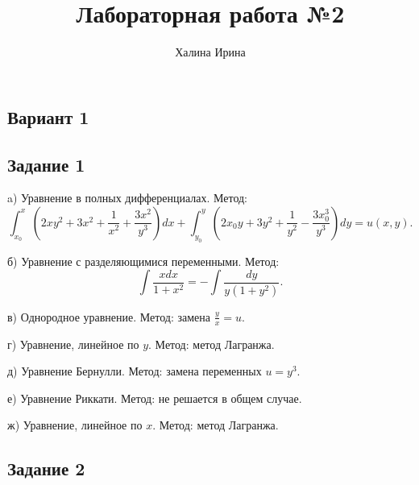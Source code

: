 \documentclass[11pt, a4paper]{article}
\title{Лабораторная работа №2}
\author{Халина Ирина}
\begin{document}
	\par\maketitle
	
	\begin{center}
	\subsection*{Вариант 1}
	\end{center}
	
	\subsection*{Задание 1}
	
	\par
	a) Уравнение в полных дифференциалах. Метод:
	\begin{equation*}
		\int_{x_0}^{x}\left(2xy^2+3x^2+\frac{1}{x^2}+\frac{3x^2}{y^3}\right)dx+\int_{y_0}^{y}\left(2x_0y+3y^2+\frac{1}{y^2}-\frac{3x_0^3}{y^3}\right)dy=u(x,y).
	\end{equation*}
	
	\noindent
	б) Уравнение с разделяющимися переменными. Метод:
	\begin{equation*}
		\int \frac{xdx}{1+x^2}=-\int \frac{dy}{y(1+y^2)}.
	\end{equation*}
	
	\noindent
	в) Однородное уравнение. Метод: замена $\frac{y}{x}=u$.
	
	\noindent
	г) Уравнение, линейное по $y$. Метод: метод Лагранжа.
	
	\noindent
	д) Уравнение Бернулли. Метод: замена переменных $u=y^3$.
	
	\noindent
	е) Уравнение Риккати. Метод: не решается в общем случае.
	
	\noindent
	ж) Уравнение, линейное по $x$. Метод: метод Лагранжа.

	
	\subsection*{Задание 2}
	
\end{document}
